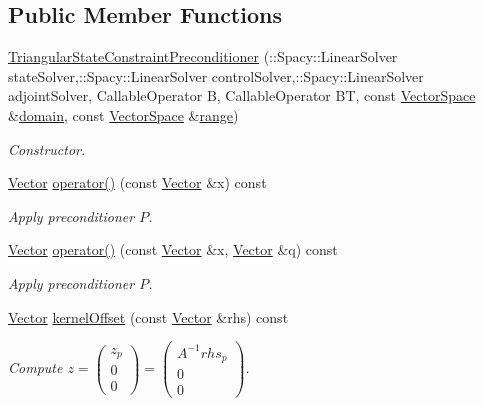 \subsection*{\-Public \-Member \-Functions}
\begin{DoxyCompactItemize}
\item 
\hyperlink{classSpacy_1_1CG_1_1TriangularStateConstraintPreconditioner_a8bbfa8bf7bdfcd3c308d4dbec8c448d0}{\-Triangular\-State\-Constraint\-Preconditioner} (\-::\-Spacy\-::\-Linear\-Solver state\-Solver,\-::\-Spacy\-::\-Linear\-Solver control\-Solver,\-::\-Spacy\-::\-Linear\-Solver adjoint\-Solver, \-Callable\-Operator \-B, \-Callable\-Operator \-B\-T, const \hyperlink{classSpacy_1_1VectorSpace}{\-Vector\-Space} \&\hyperlink{classSpacy_1_1OperatorBase_a2588f9b3e0188820c4c494e63293dc6f}{domain}, const \hyperlink{classSpacy_1_1VectorSpace}{\-Vector\-Space} \&\hyperlink{classSpacy_1_1OperatorBase_ab19d3b7a6f290b1079248f1e567e53d6}{range})
\begin{DoxyCompactList}\small\item\em \-Constructor. \end{DoxyCompactList}\item 
\hyperlink{classSpacy_1_1Vector}{\-Vector} \hyperlink{classSpacy_1_1CG_1_1TriangularStateConstraintPreconditioner_acf6c7985d679599274592917fdae5cbc}{operator()} (const \hyperlink{classSpacy_1_1Vector}{\-Vector} \&x) const 
\begin{DoxyCompactList}\small\item\em \-Apply preconditioner $P$. \end{DoxyCompactList}\item 
\hyperlink{classSpacy_1_1Vector}{\-Vector} \hyperlink{classSpacy_1_1CG_1_1TriangularStateConstraintPreconditioner_aa9baf40f360b9544b50904dc93371c3c}{operator()} (const \hyperlink{classSpacy_1_1Vector}{\-Vector} \&x, \hyperlink{classSpacy_1_1Vector}{\-Vector} \&q) const 
\begin{DoxyCompactList}\small\item\em \-Apply preconditioner $P$. \end{DoxyCompactList}\item 
\hyperlink{classSpacy_1_1Vector}{\-Vector} \hyperlink{classSpacy_1_1CG_1_1TriangularStateConstraintPreconditioner_a959f6f366b868163b6cbeda7c96bcc8e}{kernel\-Offset} (const \hyperlink{classSpacy_1_1Vector}{\-Vector} \&rhs) const 
\begin{DoxyCompactList}\small\item\em \-Compute $ z = \left( \begin{array}{c} z_p \\ 0 \\ 0 \end{array} \right) = \left( \begin{array}{c} A^{-1}rhs_p \\ 0 \\ 0 \end{array} \right) $. \end{DoxyCompactList}\item 

\end{DoxyCompactItemize}
